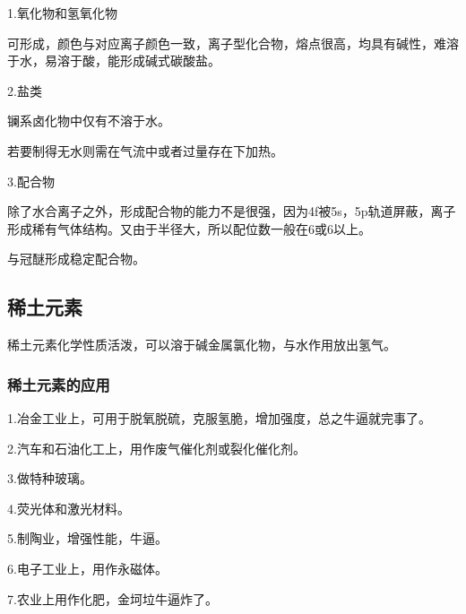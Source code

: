 \documentclass[a4paper,UTF8]{article}
\begin{document}
1.氧化物和氢氧化物

可形成，颜色与对应离子颜色一致，离子型化合物，熔点很高，均具有碱性，难溶于水，易溶于酸，能形成碱式碳酸盐。

2.盐类

镧系卤化物中仅有不溶于水。

若要制得无水则需在气流中或者过量存在下加热。

3.配合物

除了水合离子之外，形成配合物的能力不是很强，因为4f被5s，5p轨道屏蔽，离子形成稀有气体结构。又由于半径大，所以配位数一般在6或6以上。

与冠醚形成稳定配合物。

\subsection{稀土元素}

稀土元素化学性质活泼，可以溶于碱金属氯化物，与水作用放出氢气。

\subsubsection{稀土元素的应用}

1.冶金工业上，可用于脱氧脱硫，克服氢脆，增加强度，总之牛逼就完事了。

2.汽车和石油化工上，用作废气催化剂或裂化催化剂。

3.做特种玻璃。

4.荧光体和激光材料。

5.制陶业，增强性能，牛逼。

6.电子工业上，用作永磁体。

7.农业上用作化肥，金坷垃牛逼炸了。
\end{document}
